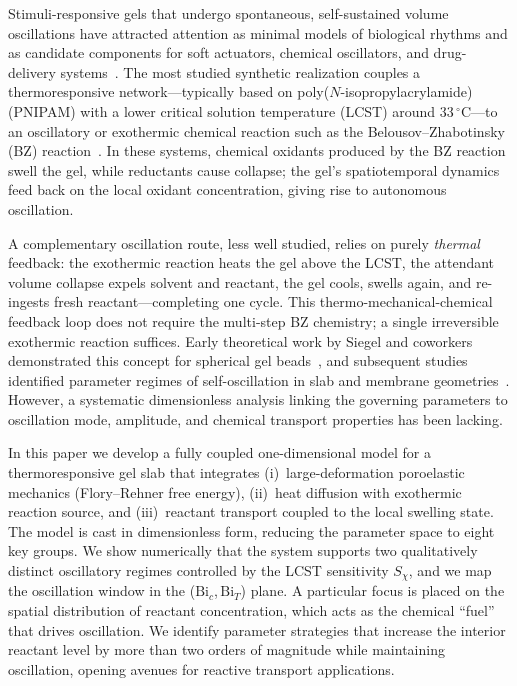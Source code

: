 \documentclass[aps,pre,reprint,superscriptaddress,longbibliography,floatfix]{revtex4-2}
\newcommand{\Bi}{\mathrm{Bi}}
\begin{document}
Stimuli-responsive gels that undergo spontaneous, self-sustained volume
oscillations have attracted attention as minimal models of biological rhythms
and as candidate components for soft actuators, chemical oscillators, and
drug-delivery systems~\cite{Yoshida2010,Turing1952}. The most studied
synthetic realization couples a thermoresponsive network---typically based on
poly($N$-isopropylacrylamide) (PNIPAM) with a lower critical solution
temperature (LCST) around $33\,^\circ\mathrm{C}$---to an oscillatory or
exothermic chemical reaction such as the Belousov--Zhabotinsky (BZ)
reaction~\cite{Yoshida2002,Yoshida2004,Yashin2006}. In these systems,
chemical oxidants produced by the BZ reaction swell the gel, while reductants
cause collapse; the gel's spatiotemporal dynamics feed back on the local
oxidant concentration, giving rise to autonomous oscillation.

A complementary oscillation route, less well studied, relies on purely
\emph{thermal} feedback: the exothermic reaction heats the gel above the
LCST, the attendant volume collapse expels solvent and reactant, the gel
cools, swells again, and re-ingests fresh reactant—completing one cycle.
This thermo-mechanical-chemical feedback loop does not require the
multi-step BZ chemistry; a single irreversible exothermic reaction
suffices. Early theoretical work by Siegel and coworkers demonstrated this
concept for spherical gel beads~\cite{Siegel1988,Siegel1992}, and subsequent
studies identified parameter regimes of self-oscillation in slab and membrane
geometries~\cite{review_ref}. However, a systematic dimensionless analysis
linking the governing parameters to oscillation mode, amplitude, and chemical
transport properties has been lacking.

In this paper we develop a fully coupled one-dimensional model for a
thermoresponsive gel slab that integrates (i)~large-deformation poroelastic
mechanics (Flory--Rehner free energy), (ii)~heat diffusion with
exothermic reaction source, and (iii)~reactant transport coupled to the
local swelling state. The model is cast in dimensionless form, reducing
the parameter space to eight key groups. We show numerically that the system
supports two qualitatively distinct oscillatory regimes controlled by the
LCST sensitivity $S_\chi$, and we map the oscillation window in the
($\Bi_c$,\,$\Bi_T$) plane. A particular focus is placed on the spatial
distribution of reactant concentration, which acts as the chemical ``fuel''
that drives oscillation. We identify parameter strategies that increase
the interior reactant level by more than two orders of magnitude while
maintaining oscillation, opening avenues for reactive transport applications.
\end{document}
